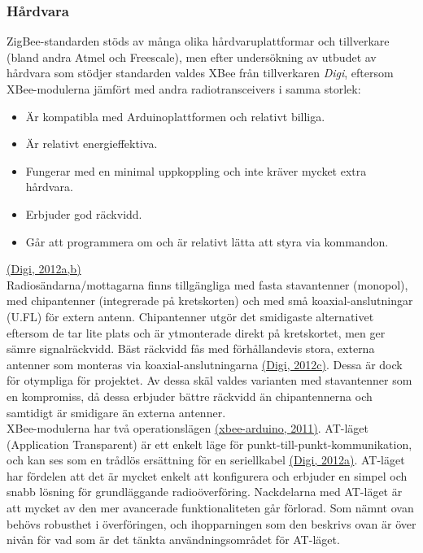 \documentclass[a4paper,11pt]{article}
\begin{document}
\subsubsection{Hårdvara}
ZigBee-standarden stöds av många olika hårdvaruplattformar och tillverkare (bland andra Atmel och Freescale), men efter undersökning av utbudet av hårdvara som stödjer standarden valdes XBee från tillverkaren {\it Digi}, eftersom XBee-modulerna jämfört med andra radiotransceivers i samma storlek:
	
	\begin{itemize}
	\item Är kompatibla med Arduinoplattformen och relativt billiga.
    	\item Är relativt energieffektiva.
    	\item Fungerar med en minimal uppkoppling och inte kräver mycket extra hårdvara.
    	\item Erbjuder god räckvidd.
    	\item Går att programmera om och är relativt lätta att styra via kommandon.
	\end{itemize}
\hyperref[digi]{(Digi, 2012a,b)}\\
	
Radiosändarna/mottagarna finns tillgängliga med fasta stavantenner (monopol), med chipantenner (integrerade på kretskorten) och med små koaxial-anslutningar (U.FL) för extern antenn. Chipantenner utgör det smidigaste alternativet eftersom de tar lite plats och är ytmonterade direkt på kretskortet, men ger sämre signalräckvidd. Bäst räckvidd fås med förhållandevis stora, externa antenner som monteras via koaxial-anslutningarna \hyperref[digi]{(Digi, 2012c)}. Dessa är dock för otympliga för projektet. Av dessa skäl valdes varianten med stavantenner som en kompromiss, då dessa erbjuder bättre räckvidd än chipantennerna och samtidigt är smidigare än externa antenner. \\

XBee-modulerna har två operationslägen \hyperref[xbeearduino]{(xbee-arduino, 2011)}. AT-läget (Application Transparent) är ett enkelt läge för punkt-till-punkt-kommunikation, och kan ses som en trådlös ersättning för en seriellkabel \hyperref[digi]{(Digi, 2012a)}. AT-läget har fördelen att det är mycket enkelt att konfigurera och erbjuder en simpel och snabb lösning för grundläggande radioöverföring. Nackdelarna med AT-läget är att mycket av den mer avancerade funktionaliteten går förlorad. Som nämnt ovan behövs robusthet i överföringen, och ihopparningen som den beskrivs ovan är över nivån för vad som är det tänkta användningsområdet för AT-läget. \\
\end{document}

